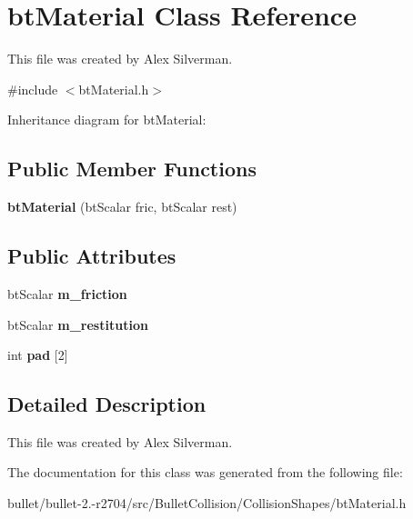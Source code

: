 \hypertarget{classbt_material}{\section{bt\+Material Class Reference}
\label{classbt_material}
}


This file was created by Alex Silverman.  




{\ttfamily \#include $<$bt\+Material.\+h$>$}



Inheritance diagram for bt\+Material\+:
\subsection*{Public Member Functions}
\begin{DoxyCompactItemize}
\item 
\hypertarget{classbt_material_a5560dbe9cbe62d3208918d60ffadc6ef}{{\bfseries bt\+Material} (bt\+Scalar fric, bt\+Scalar rest)}\label{classbt_material_a5560dbe9cbe62d3208918d60ffadc6ef}

\end{DoxyCompactItemize}
\subsection*{Public Attributes}
\begin{DoxyCompactItemize}
\item 
\hypertarget{classbt_material_a7b89ad70b06e291edc936e761372d7d2}{bt\+Scalar {\bfseries m\+\_\+friction}}\label{classbt_material_a7b89ad70b06e291edc936e761372d7d2}

\item 
\hypertarget{classbt_material_a6fe1c9b899fa7aaaf2abd134555604f1}{bt\+Scalar {\bfseries m\+\_\+restitution}}\label{classbt_material_a6fe1c9b899fa7aaaf2abd134555604f1}

\item 
\hypertarget{classbt_material_a6d31508308812202bc3028294c56fbf6}{int {\bfseries pad} \mbox{[}2\mbox{]}}\label{classbt_material_a6d31508308812202bc3028294c56fbf6}

\end{DoxyCompactItemize}


\subsection{Detailed Description}
This file was created by Alex Silverman. 

The documentation for this class was generated from the following file\+:\begin{DoxyCompactItemize}
\item 
bullet/bullet-\/2.-\/r2704/src/\+Bullet\+Collision/\+Collision\+Shapes/bt\+Material.\+h\end{DoxyCompactItemize}
